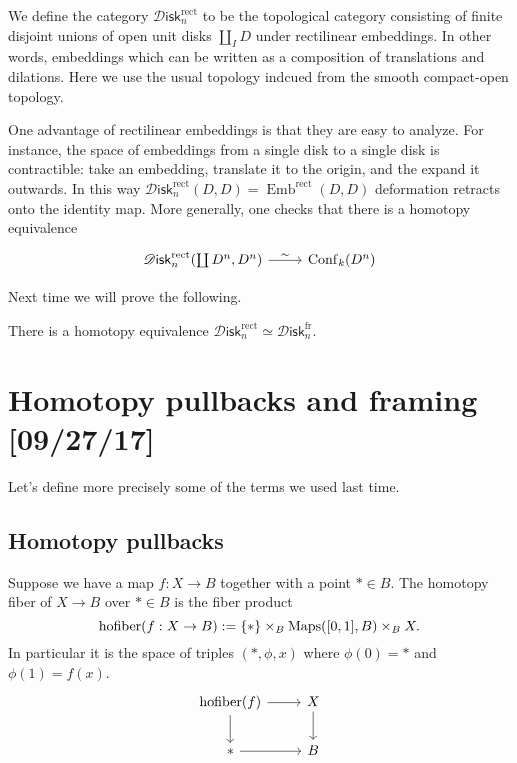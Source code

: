 \documentclass{amsart}
\DeclareMathOperator{\Emb}{Emb}
\DeclareMathOperator{\Conf}{Conf}
\DeclareMathOperator{\hofiber}{hofiber}
\newcommand{\Diskf}{\mathscr{D}\mathsf{isk}_n^\text{fr}}
\newcommand{\Diskr}{\mathscr{D}\mathsf{isk}_n^\text{rect}}
\begin{document}
\begin{definition}
    We define the category $\Diskr$ to be the topological category consisting of 
    finite disjoint unions of open unit disks $\coprod_I D$ under rectilinear
    embeddings. In other words, embeddings which can be written as a composition
    of translations and dilations. Here we use the usual topology indcued from
    the smooth compact-open topology.
\end{definition}
One advantage of rectilinear embeddings is that they are easy to analyze.
For instance, the space of embeddings from a single disk to a single disk is contractible:
take an embedding, translate it to the origin, and the expand it outwards. In this
way $\Diskr(D,D)=\Emb^\text{rect}(D,D)$ deformation retracts onto the identity map.
More generally, one checks that there is a homotopy equivalence
\begin{equation*}
    \begin{tikzcd}
        \Diskr(\coprod D^n, D^n) \rar{\sim} & \Conf_k(D^n)
    \end{tikzcd}
\end{equation*}

Next time we will prove the following.
\begin{proposition}
    There is a homotopy equivalence $\Diskr \simeq \Diskf$.
\end{proposition}


\newpage
\section{Homotopy pullbacks and framing [09/27/17]}

Let's define more precisely some of the terms we used last time.

\subsection{Homotopy pullbacks}

\begin{definition}
    Suppose we have a map $f:X\to B$ together with a point $*\in B$. The homotopy fiber
    of $X\to B$ over $*\in B$ is the fiber product
    \begin{equation*}
        \hofiber(f:X\to B) := \{*\}\times_B\Maps([0,1], B)\times_B X.
    \end{equation*}
    In particular it is the space of triples $(*, \phi, x)$ where $\phi(0)=*$
    and $\phi(1)=f(x)$.
    \begin{equation*}
        \begin{tikzcd}
            \hofiber(f) \rar \dar & X\dar \\
            * \rar & B
        \end{tikzcd}
    \end{equation*}
\end{definition}
\end{document}
